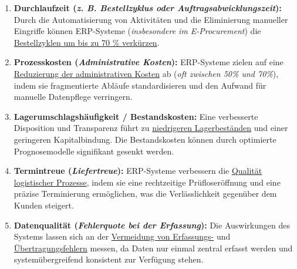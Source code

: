 \begin{enumerate}[label=\arabic*.), leftmargin=*]
    \item \textbf{Durchlaufzeit (\textit{\acs{z. B.} Bestellzyklus oder Auftragsabwicklungszeit}):} Durch die Automatisierung von Aktivitäten und die Eliminierung manueller Eingriffe können \acs{ERP}-Systeme (\textit{insbesondere im E-Procurement}) die \uline{Bestellzyklen um bis zu 70 \% verkürzen}. \cite{135}\cite{136}
    \item \textbf{Prozesskosten (\textit{Administrative Kosten}):} \acs{ERP}-Systeme zielen auf eine \uline{Reduzierung der administrativen Kosten} ab (\textit{oft zwischen 50\% und 70\%}), indem sie fragmentierte Abläufe standardisieren und den Aufwand für manuelle Datenpflege verringern. \cite{31}\cite{136}\cite{137}
    \item \textbf{Lagerumschlagshäufigkeit / Bestandskosten:} Eine verbesserte Disposition und Transparenz führt zu \uline{niedrigeren Lagerbeständen} und einer geringeren Kapitalbindung. Die Bestandskosten können durch optimierte Prognosemodelle signifikant gesenkt werden. \cite{135}\cite{136}\cite{137}\cite{138}
    \item \textbf{Termintreue (\textit{Liefertreue}):} \acs{ERP}-Systeme verbessern die \uline{Qualität logistischer Prozesse}, indem sie eine rechtzeitige Prüfloseröffnung und eine präzise Terminierung ermöglichen, was die Verlässlichkeit gegenüber dem Kunden steigert. \cite{136}\cite{139}\cite{140}
    \item \textbf{Datenqualität (\textit{Fehlerquote bei der Erfassung}):} Die Auswirkungen des Systems lassen sich an der \uline{Vermeidung von Erfassungs-} und \uline{Übertragungsfehlern} messen, da Daten nur einmal zentral erfasst werden und systemübergreifend konsistent zur Verfügung stehen. \cite{107}\cite{136}\cite{141}
\end{enumerate}


